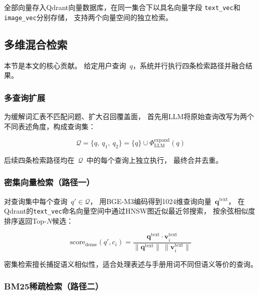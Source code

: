 全部向量存入Qdrant向量数据库，在同一集合下以具名向量字段
\texttt{text\_vec}和\texttt{image\_vec}分别存储，
支持两个向量空间的独立检索。

\subsection{多维混合检索}
\label{sec:retrieval}

本节是本文的核心贡献。
给定用户查询~$q$，系统并行执行四条检索路径并融合结果。

\subsubsection{多查询扩展}
\label{sec:multi-query}

为缓解词汇表不匹配问题、扩大召回覆盖面，
首先用LLM将原始查询改写为两个不同表述角度，构成查询集：

\begin{equation}
  \mathcal{Q} = \{q,\ q_1,\ q_2\}
              = \{q\} \cup \Phi_{\text{LLM}}^{\text{expand}}(q)
  \label{eq:multi-query}
\end{equation}

后续四条检索路径均在~$\mathcal{Q}$~中的每个查询上独立执行，
最终合并去重。

\subsubsection{密集向量检索（路径一）}
\label{sec:dense}

对查询集中每个查询~$q' \in \mathcal{Q}$，
用BGE-M3编码得到1024维查询向量~$\mathbf{q}^{\text{text}}$，
在Qdrant的\texttt{text\_vec}命名向量空间中通过HNSW图近似最近邻搜索，
按余弦相似度排序返回Top-$N$候选：

\begin{equation}
  \text{score}_{\text{dense}}(q', c_i)
  = \frac{\mathbf{q}^{\text{text}} \cdot \mathbf{v}_i^{\text{text}}}
         {\|\mathbf{q}^{\text{text}}\|\ \|\mathbf{v}_i^{\text{text}}\|}
  \label{eq:dense-score}
\end{equation}

密集检索擅长捕捉语义相似性，适合处理表述与手册用词不同但语义等价的查询。

\subsubsection{BM25稀疏检索（路径二）}
\label{sec:bm25}

